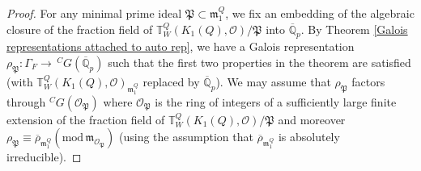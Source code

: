 \documentclass[12pt,oneside,reqno]{amsart}
\theoremstyle{plain}
\begin{document}
	\begin{proof}		
		For any minimal prime ideal
		$\mathfrak{P}
		\subset
		\mathfrak{m}_1^Q$, we fix an embedding of the algebraic closure of the fraction field of $\mathbb{T}_W^{Q}(K_1(Q),\mathcal{O})/\mathfrak{P}$ into $\overline{\mathbb{Q}}_p$.
		By
		Theorem
		\ref{Galois representations attached to auto rep},
		we have a Galois representation
		$\rho_{\mathfrak{P}}
		\colon
		\Gamma_F
		\rightarrow
		\,^C
		G(\overline{\mathbb{Q}}_p)$
		such that
		the first two properties in the theorem
		are satisfied
		(with $\mathbb{T}_W^{Q}(K_1(Q),\mathcal{O})_{\mathfrak{m}_1^Q}$
		replaced by
		$\overline{\mathbb{Q}}_p$).
		We may assume that
		$\rho_{\mathfrak{P}}$
		factors through
		$^CG(\mathcal{O}_{\mathfrak{P}})$
		where
		$\mathcal{O}_{\mathfrak{P}}$
		is the ring of integers of a
		sufficiently large finite
		extension of
		the fraction field of
		$\mathbb{T}_W^{Q}(K_1(Q),\mathcal{O})/\mathfrak{P}$
		and moreover
		$\rho_{\mathfrak{P}}  	
		\equiv
		\overline{\rho}_{\mathfrak{m}_1^Q}
		(\mathrm{mod}\,
		\mathfrak{m}_{\mathcal{O}_\mathfrak{P}})$
		(using the assumption that
		$\overline{\rho}_{\mathfrak{m}_1^Q}$
		is absolutely irreducible).
		

\end{proof}
\end{document}
